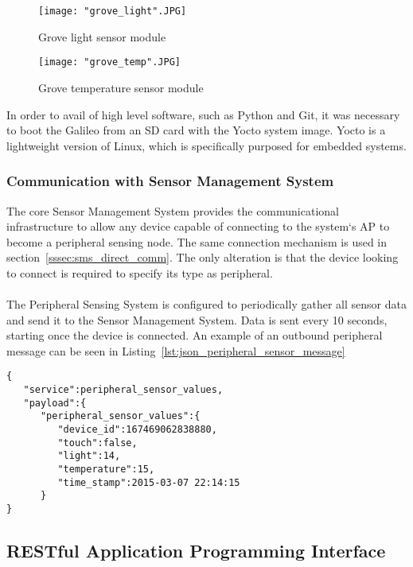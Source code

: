 \documentclass{article}
\begin{document}
\begin{figure}[H]
\centering
\texttt{[image: "grove\_light".JPG]}
\caption{Grove light sensor module}
\label{fig:hard_grove_light}
\end{figure}

\begin{figure}[H]
\centering
\texttt{[image: "grove\_temp".JPG]}
\caption{Grove temperature sensor module}
\label{fig:hard_grove_light}
\end{figure}

In order to avail of high level software, such as Python and Git, it was necessary to boot the Galileo from an SD card with the Yocto system image. Yocto is a lightweight version of Linux, which is specifically purposed for embedded systems. 

\subsubsection{Communication with Sensor Management System}
The core Sensor Management System provides the communicational infrastructure to allow any device capable of connecting to the system\lq s AP to become a peripheral sensing node. The same connection mechanism is used in section~\ref{sssec:sms_direct_comm}. The only alteration is that the device looking to connect is required to specify its type as peripheral. \\\\
The Peripheral Sensing System is configured to periodically gather all sensor data and send it to the Sensor Management System. Data is sent every 10 seconds, starting once the device is connected. An example of an outbound peripheral message can be seen in Listing~\ref{lst:json_peripheral_sensor_message}

\begin{lstlisting}[caption={JSON Peripheral Sensor Readings Message Object},label={lst:json_peripheral_sensor_message}]
{  
   "service":peripheral_sensor_values,
   "payload":{  
      "peripheral_sensor_values":{  
      	 "device_id":167469062838880,
         "touch":false,
         "light":14,
         "temperature":15,
         "time_stamp":2015-03-07 22:14:15
      }
}
\end{lstlisting}

\newpage

\subsection{RESTful Application Programming Interface}
\end{document}
